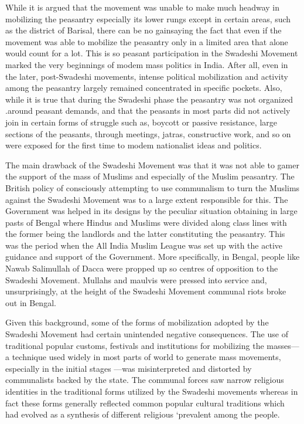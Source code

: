 While it is argued that the movement was unable to make much headway in mobilizing the peasantry especially its lower rungs except in certain areas, such as the district of Barisal, there can be no gainsaying the fact that even if the movement was able to mobilize the peasantry only in a limited area that alone would count for a lot. This is so peasant participation in the Swadeshi Movement marked the very beginnings of modem mass politics in India. After all, even in the later, post-Swadeshi movements, intense political mobilization and activity among the peasantry largely remained concentrated in specific pockets. Also, while it is true that during the Swadeshi phase the peasantry was not organized .around peasant demands, and that the peasants in most parts did not actively join in certain forms of struggle such as, boycott or passive resistance, large sections of the peasants, through meetings, jatras, constructive work, and so on were exposed for the first time to modem nationalist ideas and politics.

The main drawback of the Swadeshi Movement was that it was not able to gamer the support of the mass of Muslims and especially of the Muslim peasantry. The British policy of consciously attempting to use communalism to turn the Muslims against the Swadeshi Movement was to a large extent responsible for this. The Government was helped in its designs by the peculiar situation obtaining in large pasts of Bengal where Hindus and Muslims were divided along class lines with the former being the landlords and the latter constituting the peasantry. This was the period when the All India Muslim League was set up with the active guidance and support of the Government. More specifically, in Bengal, people like Nawab Salimullah of Dacca were propped up so centres of opposition to the Swadeshi Movement. Mullahs and maulvis were pressed into service and, unsurprisingly, at the height of the Swadeshi Movement communal riots broke out in Bengal.

Given this background, some of the forms of mobilization adopted by the Swadeshi Movement had certain unintended negative consequences. The use of traditional popular customs, festivals and institutions for mobilizing the masses—a technique used widely in most parts of world to generate mass movements, especially in the initial stages —was misinterpreted and distorted by communalists backed by the state. The communal forces saw narrow religious identities in the traditional forms utilized by the Swadeshi movements whereas in fact these forms generally reflected common popular cultural traditions which had evolved as a synthesis of different religious `prevalent among the people.

